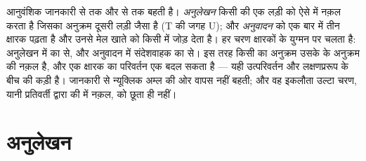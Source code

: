 \begin{proposition}[जानकारी का प्रवाह]\label{prop:b1:gene-expression:dogma}
आनुवंशिक जानकारी  से  तक और  से  तक बहती है।
\emph{अनुलेखन} किसी  की एक लड़ी को ऐसे  में नक़ल करता है जिसका
अनुक्रम दूसरी लड़ी जैसा है (T की जगह U); और \emph{अनुवादन}
 को एक बार में तीन क्षारक पढ़ता है और उनसे मेल खाते  को किसी  में जोड़ देता है। हर चरण क्षारकों के युग्मन
पर चलता है: अनुलेखन में  का  से, और अनुवादन में संदेशवाहक का
 से। इस तरह किसी  का अनुक्रम उसके  के अनुक्रम की
नक़ल है, और एक क्षारक का परिवर्तन एक  बदल सकता है --- यही
उत्परिवर्तन और लक्षणप्ररूप के बीच की कड़ी है।
जानकारी  से न्यूक्लिक अम्ल की ओर वापस नहीं बहती; और वह इकलौता
उल्टा चरण, यानी प्रतिवर्ती  द्वारा  की  में नक़ल, 
को छूता ही नहीं।
\end{proposition}

\section{अनुलेखन}


